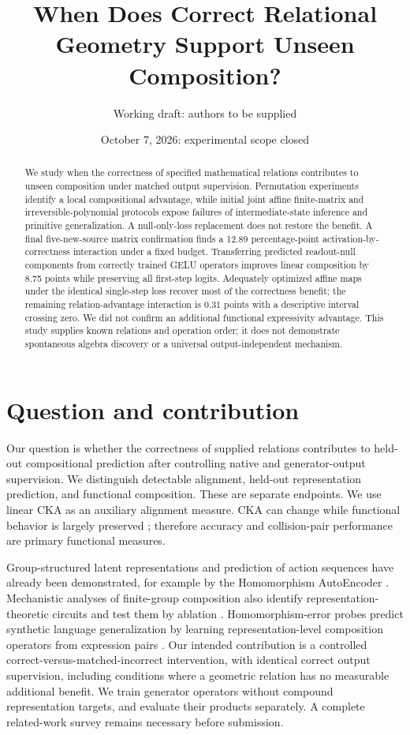 \documentclass[11pt]{article}
\title{When Does Correct Relational Geometry Support Unseen Composition?}
\author{Working draft: authors to be supplied}
\date{October 7, 2026: experimental scope closed}
\begin{document}
\maketitle
\begin{abstract}
We study when the correctness of specified mathematical relations contributes to unseen composition under matched output supervision. Permutation experiments identify a local compositional advantage, while initial joint affine finite-matrix and irreversible-polynomial protocols expose failures of intermediate-state inference and primitive generalization. A null-only-loss replacement does not restore the benefit. A final five-new-source matrix confirmation finds a 12.89 percentage-point activation-by-correctness interaction under a fixed budget. Transferring predicted readout-null components from correctly trained GELU operators improves linear composition by 8.75 points while preserving all first-step logits. Adequately optimized affine maps under the identical single-step loss recover most of the correctness benefit; the remaining relation-advantage interaction is 0.31 points with a descriptive interval crossing zero. We did not confirm an additional functional expressivity advantage. This study supplies known relations and operation order; it does not demonstrate spontaneous algebra discovery or a universal output-independent mechanism.
\end{abstract}

\section{Question and contribution}
Our question is whether the correctness of supplied relations contributes to held-out compositional prediction after controlling native and generator-output supervision. We distinguish detectable alignment, held-out representation prediction, and functional composition. These are separate endpoints. We use linear CKA \cite{kornblith2019} as an auxiliary alignment measure. CKA can change while functional behavior is largely preserved \cite{davari2022}; therefore accuracy and collision-pair performance are primary functional measures.

Group-structured latent representations and prediction of action sequences have already been demonstrated, for example by the Homomorphism AutoEncoder \cite{keurti2023}. Mechanistic analyses of finite-group composition also identify representation-theoretic circuits and test them by ablation \cite{chughtai2023}. Homomorphism-error probes predict synthetic language generalization by learning representation-level composition operators from expression pairs \cite{an2026}. Our intended contribution is a controlled correct-versus-matched-incorrect intervention, with identical correct output supervision, including conditions where a geometric relation has no measurable additional benefit. We train generator operators without compound representation targets, and evaluate their products separately. A complete related-work survey remains necessary before submission.
\end{document}
